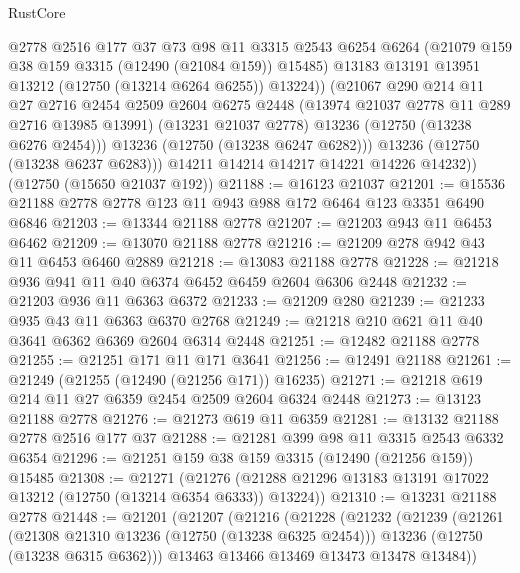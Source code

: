 \begin{lexlean}{RustCore}
\begin{coremodule}
                @2778
                @2516
                @177
                @37
                @73
                @98
                @11
                @3315
                @2543
                @6254
                @6264
                (@21079 @159 @38 @159 @3315 (@12490 (@21084 @159)) @15485)
                @13183
                @13191
                @13951
                @13212
                (@12750 (@13214 @6264 @6255))
                @13224))
            (@21067
              @290
              @214
              @11
              @27
              @2716
              @2454
              @2509
              @2604
              @6275
              @2448
              (@13974 @21037 @2778 @11 @289 @2716 @13985 @13991)
              (@13231 @21037 @2778)
              @13236
              (@12750 (@13238 @6276 @2454)))
            @13236
            (@12750 (@13238 @6247 @6282)))
          @13236
          (@12750 (@13238 @6237 @6283)))
        @14211
        @14214
        @14217
        @14221
        @14226
        @14232))
    (@12750 (@15650 @21037 @192))
@21188 := @16123 @21037
@21201 := @15536 @21188 @2778 @2778 @123 @11 @943 @988 @172 @6464 @123 @3351 @6490 @6846
@21203 := @13344 @21188 @2778
@21207 := @21203 @943 @11 @6453 @6462
@21209 := @13070 @21188 @2778
@21216 := @21209 @278 @942 @43 @11 @6453 @6460 @2889
@21218 := @13083 @21188 @2778
@21228 := @21218 @936 @941 @11 @40 @6374 @6452 @6459 @2604 @6306 @2448
@21232 := @21203 @936 @11 @6363 @6372
@21233 := @21209 @280
@21239 := @21233 @935 @43 @11 @6363 @6370 @2768
@21249 := @21218 @210 @621 @11 @40 @3641 @6362 @6369 @2604 @6314 @2448
@21251 := @12482 @21188 @2778
@21255 := @21251 @171 @11 @171 @3641
@21256 := @12491 @21188
@21261 := @21249 (@21255 (@12490 (@21256 @171)) @16235)
@21271 := @21218 @619 @214 @11 @27 @6359 @2454 @2509 @2604 @6324 @2448
@21273 := @13123 @21188 @2778
@21276 := @21273 @619 @11 @6359
@21281 := @13132 @21188 @2778 @2516 @177 @37
@21288 := @21281 @399 @98 @11 @3315 @2543 @6332 @6354
@21296 := @21251 @159 @38 @159 @3315 (@12490 (@21256 @159)) @15485
@21308 := @21271
    (@21276 (@21288 @21296 @13183 @13191 @17022 @13212 (@12750 (@13214 @6354 @6333)) @13224))
@21310 := @13231 @21188 @2778
@21448 := @21201
    (@21207
      (@21216
        (@21228
          (@21232
            (@21239
              (@21261
                (@21308 @21310 @13236 (@12750 (@13238 @6325 @2454)))
                @13236
                (@12750 (@13238 @6315 @6362)))
              @13463
              @13466
              @13469
              @13473
              @13478
              @13484))

\end{coremodule}
\end{lexlean}

